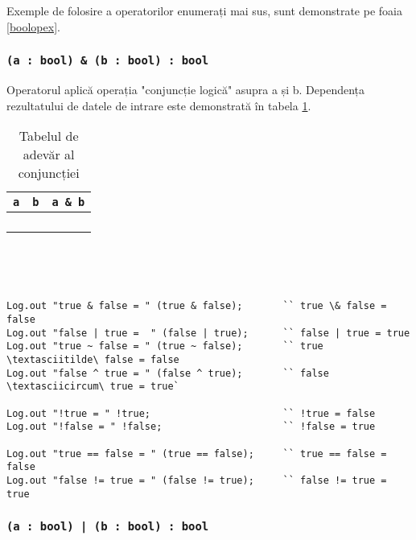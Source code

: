Exemple de folosire a operatorilor enumerați mai sus, sunt demonstrate pe foaia \ref{boolopex}.

\subsubsection{\texttt{(a : bool) & (b : bool) : bool}}

Operatorul aplică operația "conjuncție logică" asupra a și b. Dependența rezultatului de datele de intrare este demonstrată în tabela \ref{conjtable}.

\begin{table}[htb]
	\caption{Tabelul de adevăr al conjuncției}
	\label{conjtable}
	\begin{tabular}{|c|c|c|}
		\hline
		\texttt{a} & \texttt{b} & \texttt{a \& b} \\ \hline
		\false{} & \false{} & \false{}  	\\ \hline
		\false{} & \true{}  & \false{}  	\\ \hline
		\true{}  & \false{} & \false{}  	\\ \hline
		\true{}  & \true{}  & \true{}   	\\ \hline
	\end{tabular}
	\vspace{0em}
\end{table}

\

\

\begin{sourcecode}
\label{boolopex}
\begin{verbatim}
Log.out "true & false = " (true & false);		`` true \& false = false
Log.out "false | true =  " (false | true);		`` false | true = true
Log.out "true ~ false = " (true ~ false);		`` true \textasciitilde\ false = false
Log.out "false ^ true = " (false ^ true);		`` false \textasciicircum\ true = true`

Log.out "!true = " !true;						`` !true = false
Log.out "!false = " !false;				  		`` !false = true

Log.out "true == false = " (true == false);		`` true == false = false
Log.out "false != true = " (false != true);		`` false != true = true
\end{verbatim}
\end{sourcecode}

\subsubsection{\texttt{(a : bool) | (b : bool) : bool}}

